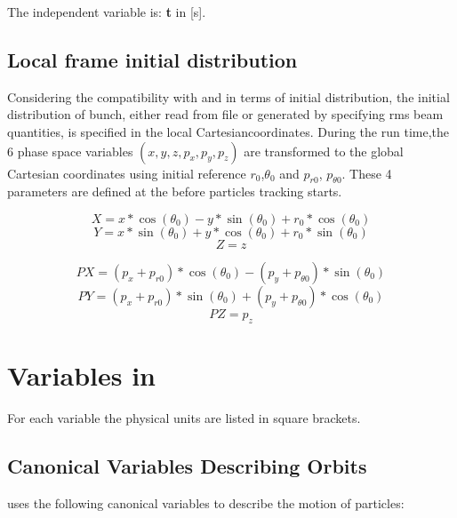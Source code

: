 The independent variable is: \textbf{t} in [s].


\subsection{Local frame initial distribution}
\label{sec:canon}
Considering the compatibility with \opalt and \opalmap in terms of initial distribution,  
the initial distribution of bunch,
either read from file or generated by specifying rms beam quantities,
is specified in the local Cartesiancoordinates.
During the run time,the 6 phase space variables \((x, y, z, p_x, p_y, p_z)\) 
are transformed to the global Cartesian coordinates
using initial reference $r_0$,$\theta_0$ and $p_{r0}$, $p_{\theta 0}$.
These 4 parameters are defined at the 
before particles tracking starts. 

  
\[ X = x*\cos(\theta_0) - y*\sin(\theta_0) + r_0*\cos(\theta_0) \]
\[ Y = x*\sin(\theta_0) + y*\cos(\theta_0) + r_0*\sin(\theta_0) \]
\[ Z = z \]

\[ PX = (p_x+p_{r0})*\cos(\theta_0) - (p_y+p_{\theta 0})*\sin(\theta_0) \]
\[ PY = (p_x+p_{r0})*\sin(\theta_0) + (p_y+p_{\theta 0})*\cos(\theta_0) \]
\[ PZ = p_z \]
    

\section{Variables in \opalmap}
\label{sec:variables}
For each variable the physical units are listed in square brackets.

\subsection{Canonical Variables Describing Orbits}
\label{sec:canon}
\opalmap uses the following canonical variables
to describe the motion of particles:

